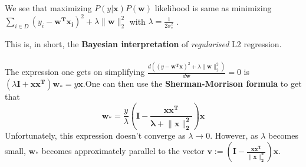 \documentclass[12pt]{article}
\begin{document}
\noindent We see that maximizing $P(y|\boldsymbol{x})P(\boldsymbol{w})$ likelihood is same as minimizing \\ $\sum_{i\in D}(y_i - \boldsymbol{w^Tx_i})^2 + \lambda\lVert\boldsymbol{w}\rVert^2_2$ with $\lambda=\frac{1}{2\sigma_*^2}$ . 

\vspace{10pt}

\noindent This is, in short, the \textbf{Bayesian interpretation} of \emph{regularised} L2 regression.
\\ \\ The expression one gets on simplifying $\frac{d((y-\boldsymbol{w^Tx})^2 + \lambda\lVert\boldsymbol{w}\rVert^2_2)} {d\boldsymbol{w}} = 0$ is $(\lambda\boldsymbol{I + xx^T})\boldsymbol{w}_* = y\boldsymbol{x}$.One can then use the \textbf{Sherman-Morrison formula} to get that 
$$\boldsymbol{w}_* = \frac{y}{\lambda}\left(\boldsymbol{I - \frac{xx^T}{\lambda + \lVert x\rVert^2_2}}\right)\boldsymbol{x}$$
Unfortunately, this expression doesn't converge as $\lambda\rightarrow 0$. However, as $\lambda$ becomes small, $\boldsymbol{w}_*$ becomes approximately parallel to the vector $\boldsymbol{v} := \left(\boldsymbol{I - \frac{xx^T}{\lVert x\rVert^2_2}}\right)\boldsymbol{x}$.

\end{document}
